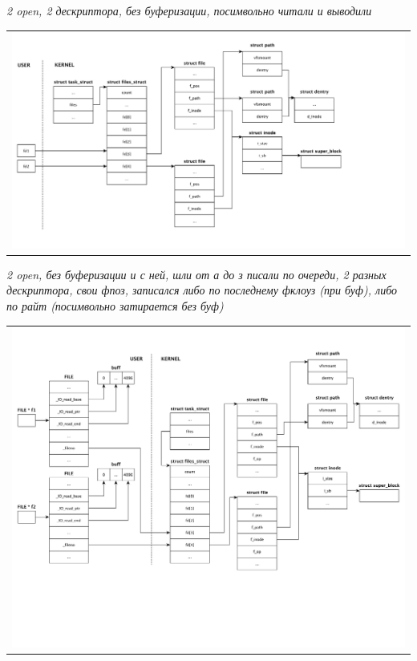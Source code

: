 \textit{2 open, 2 дескриптора, без буферизации, посимвольно читали и выводили}
\begin{table}[H]
  \centering
  \begin{tabular}{p{1\linewidth}}
    \centering
    \includegraphics[width=0.8\linewidth]{./images/scheme2.pdf}
  \end{tabular}
\end{table}

\textit{2 open, без буферизации и с ней, шли от а до з писали по очереди, 2 разных дескриптора, свои фпоз, записался либо по последнему фклоуз (при буф), либо по райт (посимвольно затирается без буф)}
\begin{table}[H]
  \centering
  \begin{tabular}{p{1\linewidth}}
    \centering
    \includegraphics[width=0.8\linewidth]{./images/scheme3.pdf}
  \end{tabular}
\end{table}


